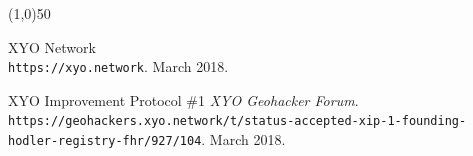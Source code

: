 \documentclass{article}
\begin{document}
\begin{center}
\line(1,0){50}
\end{center}

\begin{thebibliography}{9}

XYO Network
\\\texttt{https://xyo.network}.
March 2018.

XYO Improvement Protocol \#1
\textit{XYO Geohacker Forum}.
\\\texttt{https://geohackers.xyo.network/t/status-accepted-xip-1-founding-hodler-registry-fhr/927/104}.
March 2018.

\end{thebibliography}

\end{document}
